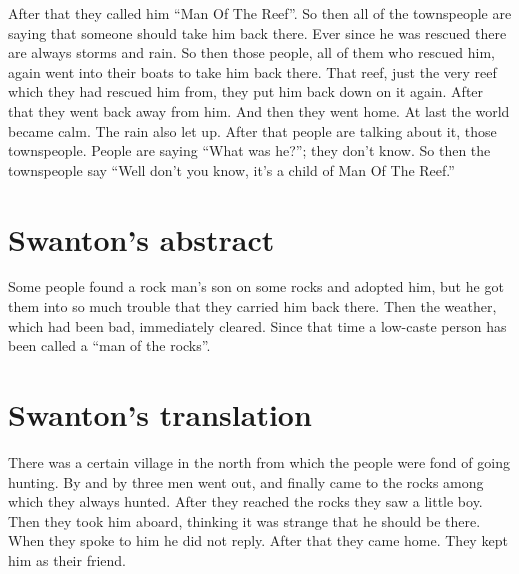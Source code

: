 \begin{pairs}
\begin{Rightside}
\pstart
{}After that they called him “Man Of The Reef”.
So then all of the townspeople are saying that someone should take him back there.
Ever since he was rescued there are always storms and rain.
So then those people, all of them who rescued him, again went into their boats
		to take him back there.
That reef, just the very reef which they had rescued him from, they put him back down on it again.
After that they went back away from him.
And then they went home.
At last the world became calm.
The rain also let up.
After that people are talking about it, those townspeople.
People are saying “What was he?”;
they don’t know.
So then the townspeople say
“Well don’t you know, it’s a child of Man Of The Reef.”
\pend
\endnumbering
\end{Rightside}
\end{pairs}
\Columns

\section{Swanton’s abstract}\label{sec:106-swanton-abstract}

Some people found a rock man’s son on some rocks and adopted him, but he got them into so much trouble that they carried him back there.
Then the weather, which had been bad, immediately cleared.
Since that time a low-caste person has been called a “man of the rocks”.

\section{Swanton’s translation}\label{sec:106-swanton-translation}

There was a certain village in the north from which the people were fond of going hunting.
By and by three men went out, and finally came to the rocks among which they always hunted.
After they reached the rocks they saw a little boy.
Then they took him aboard, thinking it was strange that he should be there.
When they spoke to him he did not reply.
After that they came home.
They kept him as their friend.

